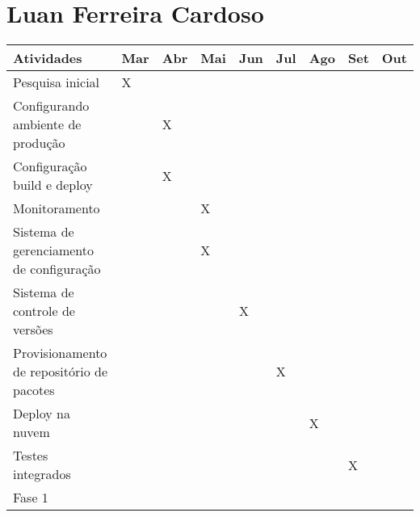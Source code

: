 \section{Luan Ferreira Cardoso}
\begin{center}
\begin{tabular}{ | m{20em} | m{0.5cm}| m{0.5cm} |
m{0.5cm} | m{0.5cm} |
m{0.5cm} |m{0.5cm} |m{0.5cm} |m{0.5cm} | }
\hline
 Atividades & Mar & Abr & Mai & Jun &
 Jul & Ago & Set & Out \\
\hline
Pesquisa inicial & X & & & & & & &  \\
\hline
Configurando ambiente de produção &  & X & & & & & & \\
\hline
Configuração build e deploy &  & X & & & & & & \\
\hline
Monitoramento &  & & X & & & & & \\
\hline
Sistema de gerenciamento de configuração &  & & X & & & & & \\
\hline
Sistema de controle de versões &  & & & X & & & & \\
\hline
Provisionamento de repositório de pacotes &  & & & & X & & & \\
\hline
Deploy na nuvem &  & & & & & X & & \\
\hline
Testes integrados & & & & & & & X & \\

Fase 1



\hline
\end{tabular}
\end{center}
